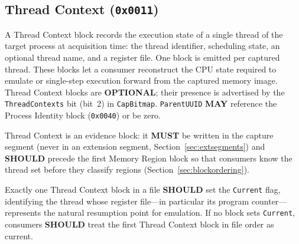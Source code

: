 \documentclass[11pt,a4paper]{article}
\newcommand{\MUST}{\textbf{MUST}}
\newcommand{\SHOULD}{\textbf{SHOULD}}
\newcommand{\MAY}{\textbf{MAY}}
\newcommand{\OPTIONAL}{\textbf{OPTIONAL}}
\newcommand{\hex}[1]{\texttt{0x#1}}
\newcommand{\field}[1]{\texttt{#1}}
\begin{document}
\subsection{Thread Context (\hex{0011})}\label{sec:threadctx}
A Thread Context block records the execution state of a single thread of the target process at acquisition time: the thread identifier, scheduling state, an optional thread name, and a register file. One block is emitted per captured thread. These blocks let a consumer reconstruct the CPU state required to emulate or single-step execution forward from the captured memory image. Thread Context blocks are \OPTIONAL; their presence is advertised by the \field{ThreadContexts} bit (bit~2) in \field{CapBitmap}. \field{ParentUUID} \MAY{} reference the Process Identity block (\hex{0040}) or be zero.

Thread Context is an evidence block: it \MUST{} be written in the capture segment (never in an extension segment, Section~\ref{sec:extsegments}) and \SHOULD{} precede the first Memory Region block so that consumers know the thread set before they classify regions (Section~\ref{sec:blockordering}).

Exactly one Thread Context block in a file \SHOULD{} set the \field{Current} flag, identifying the thread whose register file---in particular its program counter---represents the natural resumption point for emulation. If no block sets \field{Current}, consumers \SHOULD{} treat the first Thread Context block in file order as current.
\end{document}
